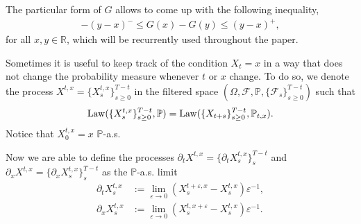\documentclass{tufte-handout}
\renewcommand{\Pr}{\mathbb{P}} %
\newcommand{\R}{\mathbb{R}} %
\begin{document}
	The particular form of $G$ allows to come up with the following inequality,
	\begin{align}\label{eq:G_inequality}
	-(y - x)^- \leq G(x) - G(y) \leq (y - x)^+, 
	\end{align}
	for all $x, y \in \R$, which will be recurrently used throughout the paper.
	
	Sometimes it is useful to keep track of the condition $X_t = x$ in a way that does not change the probability measure whenever $t$ or $x$ change. To do so, we denote the process $X^{t, x} = \{X_s^{t, x}\}_{s\geq 0}^{T - t}$ in the filtered space $(\Omega, \mathcal{F}, \Pr, \{\mathcal{F}_s\}_{s\geq 0}^{T - t})$ such that
	\begin{align}\label{eq:lawX^{t,x}-X}
	\mathrm{Law}(\{X_s^{t, x}\}_{s\geq0}^{T - t}, \Pr) = \mathrm{Law}(\{X_{t + s}\}_{s\geq 0}^{T - t}, \Pr_{t, x}).	
	\end{align}
	Notice that $X_0^{t,x} = x$ $\Pr$-a.s. 
	
	Now we are able to define the processes $\partial_t X^{t, x} = \{\partial_t X_s^{t, x}\}_{s}^{T - t}$ and $\partial_x X^{t, x} = \{\partial_x X_s^{t, x}\}_{s}^{T - t}$ as the $\Pr$-a.s. limit
	\begin{align*}
	\partial_t X_s^{t, x} &:= \lim_{\varepsilon\rightarrow 0} \left(X_s^{t + \varepsilon, x} - X_s^{t, x}\right)\varepsilon^{-1}, \\
	\partial_x X_s^{t, x} &:= \lim_{\varepsilon\rightarrow 0} \left(X_s^{t, x + \varepsilon} - X_s^{t, x}\right)\varepsilon^{-1}.
	\end{align*}
	
\end{document}
